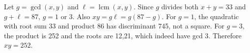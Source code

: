 Let $g=\gcd(x,y)$ and $\ell=\operatorname{lcm}(x,y)$. Since $g$ divides both $x+y=33$ and $g+\ell=87$, $g=1$ or 3. Also $xy=g\ell=g(87-g)$. For $g=1$, the quadratic with root sum 33 and product 86 has discriminant 745, not a square. For $g=3$, the product is 252 and the roots are 12,21, which indeed have gcd 3. Therefore $\boxed{xy=252}$.
